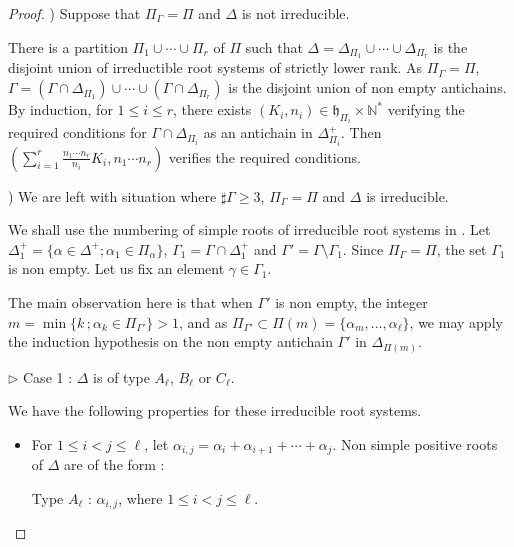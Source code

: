 \documentclass{amsart}
\theoremstyle{definition}
\theoremstyle{remark}
\numberwithin{equation}{section}
\begin{document}
\begin{proof}
\smallskip
{}) Suppose that $\Pi_{\Gamma} = \Pi$ and $\Delta$ is not irreducible.
\smallskip

There is a partition 
$\Pi_{1} \cup \cdots \cup \Pi_{r}$ of $\Pi$ 
such that $\Delta = \Delta_{\Pi_{1}}\cup \cdots \cup \Delta_{\Pi_{r}}$ is the disjoint union of irreductible 
root systems of strictly lower rank. As $\Pi_{\Gamma} = \Pi$, 
$\Gamma = ( \Gamma\cap \Delta_{\Pi_{1}} ) \cup \cdots \cup
( \Gamma\cap \Delta_{\Pi_{r}})$ is the disjoint union of non empty antichains.
By induction, for $1\leqslant i \leqslant r$, there exists 
$(K_{i} , n_{i}) \in \mathfrak{h}_{\Pi_{i}} \times \mathbb{N}^{*}$ 
verifying the required conditions for $\Gamma\cap \Delta_{\Pi_{i}}$ as an antichain in 
$\Delta_{\Pi_{i}}^{+}$.  Then $( \sum_{i=1}^{r} \frac{n_{1}\cdots n_{r}}{n_{i}} K_{i} , n_{1}\cdots n_{r})$ 
verifies the required conditions.

\smallskip
{}) We are left with situation where $\sharp \Gamma\geqslant 3$, $\Pi_{\Gamma} = \Pi$ and
$\Delta$ is irreducible.
\smallskip

We shall use the numbering of simple roots of irreducible root systems in \cite[Chapter 18]{TY}. 
Let $\Delta_{1}^{+} = \{\alpha \in\Delta^{+} ; \alpha_{1}\in \Pi_{\alpha} \}$,
$\Gamma_{1} = \Gamma \cap \Delta_{1}^{+}$ and $\Gamma' = \Gamma \setminus \Gamma_{1}$.
Since $\Pi_{\Gamma} = \Pi$, the set
$\Gamma_{1}$ is non empty. Let us fix an element $\gamma \in \Gamma_{1}$.

The main observation here is 
that when $\Gamma'$ is non empty, the integer $m = \min \{  k \, ; \alpha_{k} \in \Pi_{\Gamma'} \} >1$, 
and as $\Pi_{\Gamma'} \subset  \Pi (m) = \{ \alpha_{m},\dots ,\alpha_{\ell}\}$, we may apply 
the induction hypothesis on the non empty antichain $\Gamma'$ in $\Delta_{\Pi (m)}$.
\smallskip

\noindent$\triangleright$ Case 1 : $\Delta$ is of type $A_{\ell}$, $B_{\ell}$ or $C_{\ell}$.
\smallskip

We have the following properties for these irreducible root systems.

\begin{itemize}
\item[(P1)] For $1 \leqslant i < j \leqslant \ell$, let 
$\alpha_{i,j} = \alpha_{i} + \alpha_{i+1} + \cdots + \alpha_{j}$. 
Non simple positive roots of $\Delta$ are of the form :

Type $A_{\ell}$ : $\alpha_{i,j}$, where $1 \leqslant i < j \leqslant \ell$.


\end{itemize}
\end{proof}
\end{document}
